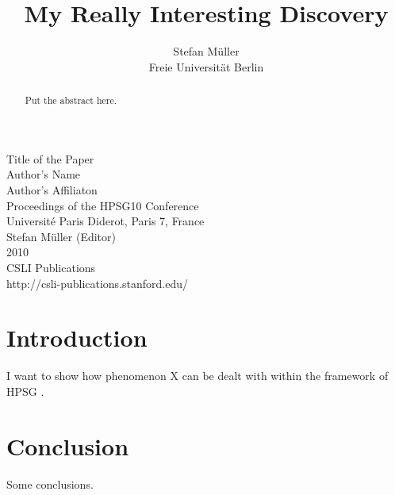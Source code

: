 \documentclass[11pt,a4paper,fleqn,draft]{article}
\title{My Really Interesting Discovery}
\author{Stefan M{\"u}ller\\
Freie Universit{\"a}t Berlin}
\begin{document}

\begin{center}
\Large
Title of the Paper\\[\baselineskip]

Author's Name\\[\baselineskip]
Author's Affiliaton\\[3\baselineskip]

                Proceedings of the HPSG10 Conference\\[\baselineskip]

                       Université Paris Diderot, Paris 7, France\\[\baselineskip]

                        Stefan M{\"u}ller (Editor)\\[\baselineskip]

                                2010\\[\baselineskip]

                          CSLI Publications\\[\baselineskip]

              http://csli-publications.stanford.edu/

\end{center}

\newpage

\begin{abstract}
Put the abstract here.
\end{abstract}

\setcounter{footnote}{2}
\renewcommand{\thefootnote}{\fnsymbol{footnote}}
\renewcommand{\thefootnote}{\arabic{footnote}}
\setcounter{footnote}{0}


\section{Introduction}

I want to show how phenomenon X can be dealt with within the framework of HPSG
\citep{PS87a,PS94a}.

\section{Conclusion}

Some conclusions.



 

\end{document}
